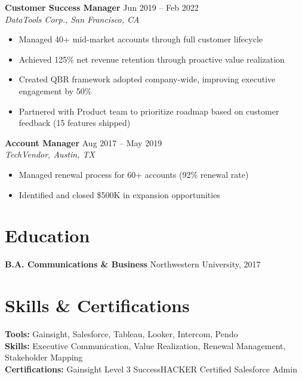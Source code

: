 \documentclass[11pt,a4paper]{article}
\begin{document}
\noindent\textbf{Customer Success Manager} \hfill \textcolor{accent}{Jun 2019 -- Feb 2022}\\
\textit{DataTools Corp., San Francisco, CA}
\begin{itemize}[leftmargin=1.2em,nosep,label={\color{accent}\textbullet}]
\item Managed 40+ mid-market accounts through full customer lifecycle
\item Achieved 125\% net revenue retention through proactive value realization
\item Created QBR framework adopted company-wide, improving executive engagement by 50\%
\item Partnered with Product team to prioritize roadmap based on customer feedback (15 features shipped)
\end{itemize}
\vspace{0.5em}

\noindent\textbf{Account Manager} \hfill \textcolor{accent}{Aug 2017 -- May 2019}\\
\textit{TechVendor, Austin, TX}
\begin{itemize}[leftmargin=1.2em,nosep,label={\color{accent}\textbullet}]
\item Managed renewal process for 60+ accounts (92\% renewal rate)
\item Identified and closed \$500K in expansion opportunities
\end{itemize}

\section{Education}
\noindent\textbf{B.A. Communications \& Business} \hfill Northwestern University, 2017

\section{Skills \& Certifications}
\noindent\textbf{Tools:} Gainsight, Salesforce, Tableau, Looker, Intercom, Pendo\\
\textbf{Skills:} Executive Communication, Value Realization, Renewal Management, Stakeholder Mapping\\
\textbf{Certifications:} Gainsight Level 3 \quad\textcolor{accent}{\textbullet}\quad SuccessHACKER Certified \quad\textcolor{accent}{\textbullet}\quad Salesforce Admin
\end{document}
